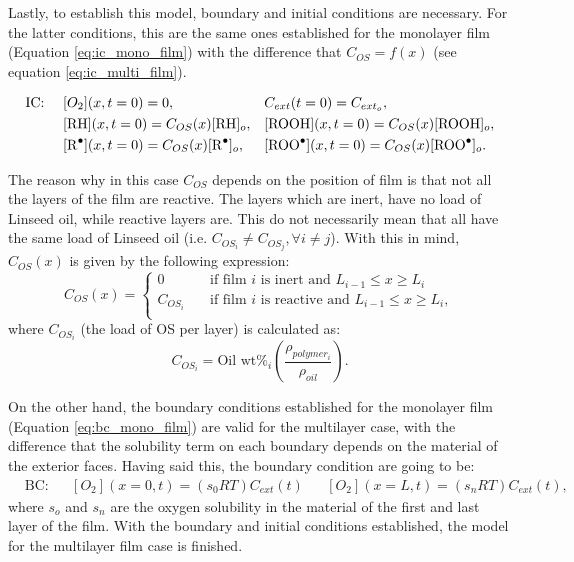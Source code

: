 \begin{refsection}
Lastly, to establish this model, boundary and initial conditions are necessary. For the latter conditions, this are the same ones established for the monolayer film (Equation  \ref{eq:ic_mono_film}) with the difference that $C_{OS}=f(x)$ (see equation \ref{eq:ic_multi_film}).

\begin{align}
    &\text{IC: } & &[O_2](x,t=0)=0, & &C_{ext}(t=0)= C_{ext_o},\nonumber\\
    && &[\ce{RH}](x,t=0)=C_{OS}(x)[\ce{RH}]_o,   & &[\ce{ROOH}](x,t=0)=C_{OS}(x)[\ce{ROOH}]_o, \nonumber\\
    && &[\ce{R^.}](x,t=0)=C_{OS}(x)[\ce{R^.}]_o,   & &[\ce{ROO^.}](x,t=0)=C_{OS}(x)[\ce{ROO^.}]_o. 
    \label{eq:ic_multi_film}
\end{align}

The reason why in this case $C_{OS}$ depends on the position of film is that not all the layers of the film are reactive. The layers which are inert, have no load of Linseed oil, while reactive layers are. This do not necessarily mean that  all have the same load of Linseed oil (i.e. $C_{OS_i}\neq C_{OS_{j}}, \forall i\neq j$). With this in mind, $C_{OS}(x)$  is given by the following expression:
\begin{equation}
    C_{OS}(x)= 
    \begin{cases}
    0  &\quad\text{if film }i \text{ is inert and } L_{i-1} \le x \ge L_i\\
    C_{OS_i}  &\quad\text{if film }i \text{ is reactive and }  L_{i-1} \le x \ge L_i,\\
    \end{cases}
\end{equation}
where $C_{OS_i}$ (the load of OS per layer) is calculated as:
\begin{equation}
    C_{OS_i}= \text{Oil wt}\%_i \left( \frac{\rho_{polymer_i}}{\rho_{oil}}\right).
    \label{eq:load_multi_concentration}
\end{equation}

On the other hand, the boundary conditions established for the monolayer film (Equation \ref{eq:bc_mono_film}) are valid for the multilayer case, with the difference that the solubility term on each boundary depends on the material of the exterior faces. Having said this, the boundary condition are going to be:
\begin{align}
    &\text{BC:} & &[O_2](x=0, t)= \left(s_0RT\right) C_{ext}(t) & & [O_2](x=L, t)= \left(s_nRT\right) C_{ext}(t),
    \label{eq:bc_multi_film}
\end{align}
where $s_o$ and $s_n$ are the oxygen solubility in the material of the first and last layer of the film. With the boundary and initial conditions established, the model for the multilayer film case is finished. 


\end{refsection}
